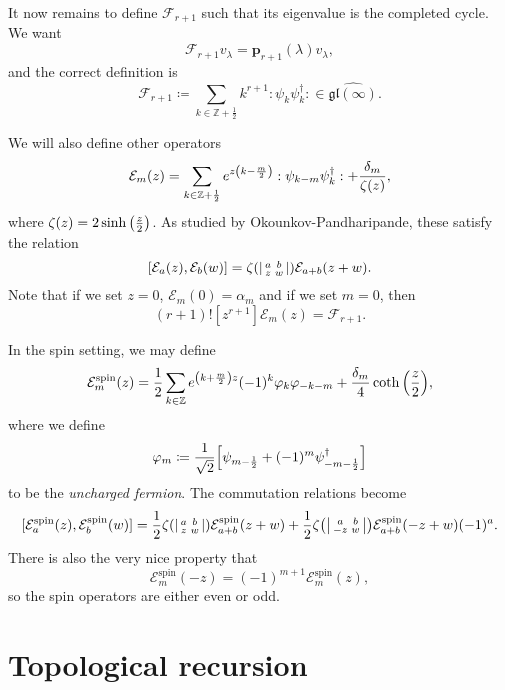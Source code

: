 \documentclass[leqno, openany]{memoir}
\theoremstyle{definition}
\theoremstyle{remark}
\theoremstyle{plain}
\theoremstyle{definition}
\theoremstyle{remark}
\newcommand{\Z}{\mathbb{Z}}
\newcommand{\mc}[1]{\mathcal{#1}}
\newcommand{\mf}[1]{\mathfrak{#1}}
\newcommand{\mr}[1]{\mathrm{#1}}
\newcommand{\wh}[1]{\widehat{#1}}
\begin{document}
It now remains to define $\mc{F}_{r+1}$ such that its eigenvalue is the completed cycle. We want
\[ \mc{F}_{r+1} v_{\lambda} = \mathbf{p}_{r+1}(\lambda) v_{\lambda}, \]
and the correct definition is
\[ \mc{F}_{r+1} \coloneqq \sum_{k \in \Z+\frac{1}{2}} k^{r+1} :\psi_k \psi_k^{\dag}: \in \wh{\mf{gl}(\infty)}. \]

We will also define other operators
\[ \mc{E}_m(z) = \sum_{k \in \Z + \frac{1}{2}} e^{z \qty(k-\frac{m}{2})} :\psi_{k-m} \psi_k^{\dag}: + \frac{\delta_m}{\zeta(z)}, \]
where $\zeta(z) = 2 \sinh\qty(\frac{z}{2})$. As studied by Okounkov-Pandharipande, these satisfy the relation
\[ [\mc{E}_a(z), \mc{E}_b(w)] = \zeta \qty(\begin{vsmallmatrix} a & b \\ z & w \end{vsmallmatrix}) \mc{E}_{a+b}(z+w). \]
Note that if we set $z = 0$, $\mc{E}_m(0) = \alpha_m$ and if we set $m=0$, then
\[ (r+1)! [z^{r+1}] \mc{E}_m(z) = \mc{F}_{r+1}. \]

In the spin setting, we may define
\[ \mc{E}_m^{\mr{spin}}(z) = \frac{1}{2} \sum_{k \in \Z} e^{\qty(k+\frac{m}{2})z} (-1)^k \varphi_k \varphi_{-k-m} + \frac{\delta_m}{4} \coth\qty(\frac{z}{2}), \]
where we define
\[ \varphi_m \coloneqq \frac{1}{\sqrt{2}} \qty[\psi_{m-\frac{1}{2}} + (-1)^m \psi_{-m-\frac{1}{2}}^{\dag}] \]
to be the \textit{uncharged fermion}. The commutation relations become
\[ [\mc{E}_a^{\mr{spin}}(z), \mc{E}_b^{\mr{spin}}(w)] = \frac{1}{2} \zeta \qty(\begin{vsmallmatrix} a & b \\ z & w \end{vsmallmatrix}) \mc{E}_{a+b}^{\mr{spin}}(z+w) + \frac{1}{2} \zeta \qty(\begin{vsmallmatrix} a & b \\ -z & w \end{vsmallmatrix}) \mc{E}_{a+b}^{\mr{spin}}(-z+w) (-1)^a. \]
There is also the very nice property that
\[ \mc{E}_m^{\mr{spin}}(-z) = (-1)^{m+1} \mc{E}_m^{\mr{spin}}(z), \]
so the spin operators are either even or odd.

\section{Topological recursion}
\label{sec:tr}
\end{document}
